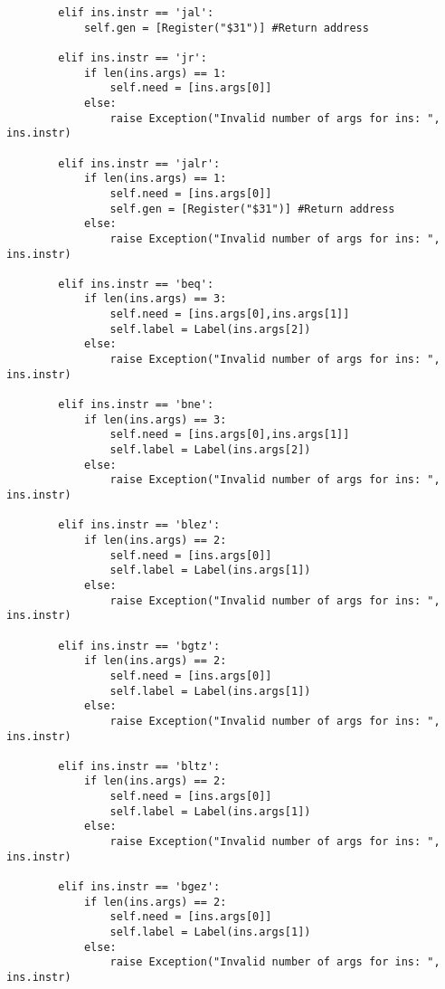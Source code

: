 \begin{lstlisting}
        elif ins.instr == 'jal':
            self.gen = [Register("$31")] #Return address
            
        elif ins.instr == 'jr':
            if len(ins.args) == 1:
                self.need = [ins.args[0]]
            else:
                raise Exception("Invalid number of args for ins: ", ins.instr)
            
        elif ins.instr == 'jalr':
            if len(ins.args) == 1:
                self.need = [ins.args[0]]
                self.gen = [Register("$31")] #Return address
            else:
                raise Exception("Invalid number of args for ins: ", ins.instr)
            
        elif ins.instr == 'beq':
            if len(ins.args) == 3:
                self.need = [ins.args[0],ins.args[1]]
                self.label = Label(ins.args[2])
            else:
                raise Exception("Invalid number of args for ins: ", ins.instr) 
                           
        elif ins.instr == 'bne':
            if len(ins.args) == 3:
                self.need = [ins.args[0],ins.args[1]]
                self.label = Label(ins.args[2])
            else:
                raise Exception("Invalid number of args for ins: ", ins.instr)
                
        elif ins.instr == 'blez':
            if len(ins.args) == 2:
                self.need = [ins.args[0]]
                self.label = Label(ins.args[1])
            else:
                raise Exception("Invalid number of args for ins: ", ins.instr)
                
        elif ins.instr == 'bgtz':
            if len(ins.args) == 2:
                self.need = [ins.args[0]]
                self.label = Label(ins.args[1])
            else:
                raise Exception("Invalid number of args for ins: ", ins.instr)
                
        elif ins.instr == 'bltz':
            if len(ins.args) == 2:
                self.need = [ins.args[0]]
                self.label = Label(ins.args[1])
            else:
                raise Exception("Invalid number of args for ins: ", ins.instr)
                
        elif ins.instr == 'bgez':
            if len(ins.args) == 2:
                self.need = [ins.args[0]]
                self.label = Label(ins.args[1])
            else:
                raise Exception("Invalid number of args for ins: ", ins.instr)
                

\end{lstlisting}
